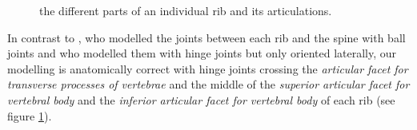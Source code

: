 \begin{figure}
\centering
{}
\caption[The different parts of an individual rib and its articulations]{\label{fig:rib} the different parts of an individual rib and  its articulations.}
\end{figure}
		
In contrast to \cite{dilorenzo2009breathing}, who modelled the joints between each rib and the spine with ball joints and \cite{veltkamp2009physiological} who modelled them with hinge joints but only oriented laterally, our modelling is anatomically correct with hinge joints crossing the \emph{articular facet for transverse processes of vertebrae} and the middle of the \emph{superior articular facet for vertebral body} and the \emph{inferior articular facet for vertebral body} of each rib (see figure \ref{fig:rib}).
		

